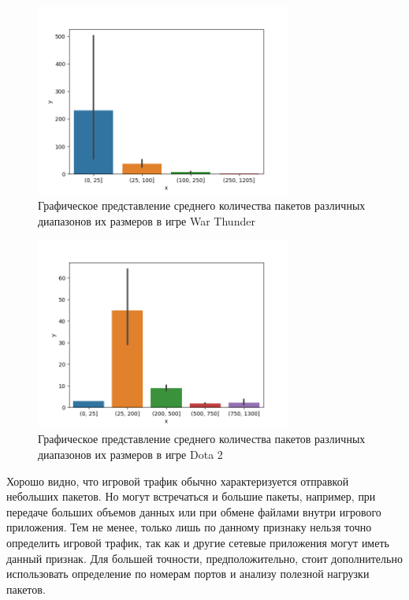 \documentclass[bachelor, och, coursework]{SCWorks}
\begin{document}
\begin{figure}[H]
    \centering
    \includegraphics[width=0.75\textwidth]{warthunder.png}
    \caption{Графическое представление среднего количества пакетов различных диапазонов их размеров в игре War Thunder}
    \label{wt}
\end{figure}

\begin{figure}[H]
    \centering
    \includegraphics[width=0.75\textwidth]{dota2.png}
    \caption{Графическое представление среднего количества пакетов различных диапазонов их размеров в игре Dota 2}
    \label{dota2}
\end{figure}

Хорошо видно, что игровой трафик обычно характеризуется отправкой небольших пакетов. Но могут встречаться и большие пакеты, например, при передаче больших объемов данных или при обмене файлами внутри игрового приложения. Тем не менее, только лишь по данному признаку нельзя точно определить игровой трафик, так как и другие сетевые приложения могут иметь данный признак. Для большей точности, предположительно, стоит дополнительно использовать определение по номерам портов и анализу полезной нагрузки пакетов. 
\end{document}
